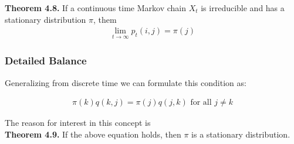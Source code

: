 \documentclass[12pt]{article}
\begin{document}
\textbf{Theorem 4.8.} If a continuous time Markov chain $X_t$ is irreducible and has a stationary distribution $\pi$, them
\begin{align*}
\lim_{t \to \infty} p_t(i, j) = \pi(j)
\end{align*}


\subsubsection{Detailed Balance}

Generalizing from discrete time we can formulate this condition as:

\begin{align*}
\pi(k)q(k, j) = \pi(j)q(j, k) \text{  for all } j \neq k
\end{align*}

The reason for interest in this concept is\\

\textbf{Theorem 4.9.} If the above equation holds, then $\pi$ is a stationary distribution.


\end{document}
